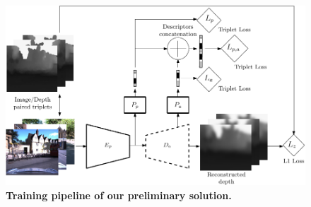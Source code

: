 \begin{figure}
	\centering
	
	\includegraphics[width=\linewidth]{preliminary/preliminary_method}
	
	\caption[Preliminary solution]{\label{fig:preliminary_method} \textbf{Training pipeline of our preliminary solution.}}
	
\end{figure}